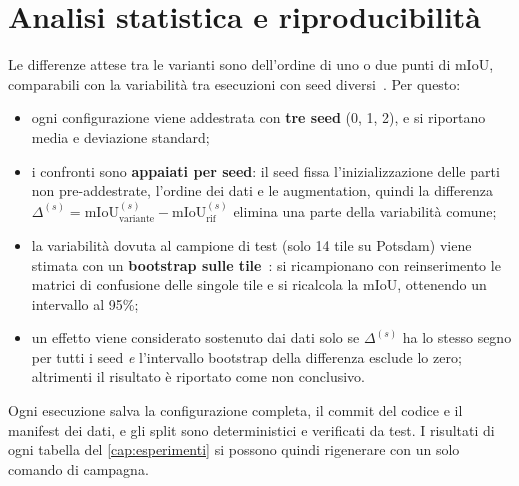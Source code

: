 \section{Analisi statistica e riproducibilità}
\label{sec:statistica}

Le differenze attese tra le varianti sono dell'ordine di uno o due punti di mIoU, comparabili con
la variabilità tra esecuzioni con seed diversi~\cite{bouthillier2021variance}. Per questo:

\begin{itemize}
  \item ogni configurazione viene addestrata con \textbf{tre seed} (0, 1, 2), e si riportano media
  e deviazione standard;
  \item i confronti sono \textbf{appaiati per seed}: il seed fissa l'inizializzazione delle parti
  non pre-addestrate, l'ordine dei dati e le augmentation, quindi la differenza
  $\Delta^{(s)}=\mathrm{mIoU}^{(s)}_{\mathrm{variante}}-\mathrm{mIoU}^{(s)}_{\mathrm{rif}}$
  elimina una parte della variabilità comune;
  \item la variabilità dovuta al campione di test (solo 14 tile su Potsdam) viene stimata con un
  \textbf{bootstrap sulle tile}~\cite{efron1993bootstrap}: si ricampionano con reinserimento le
  matrici di confusione delle singole tile e si ricalcola la mIoU, ottenendo un intervallo al
  95\%;
  \item un effetto viene considerato sostenuto dai dati solo se $\Delta^{(s)}$ ha lo stesso segno
  per tutti i seed \emph{e} l'intervallo bootstrap della differenza esclude lo zero; altrimenti
  il risultato è riportato come non conclusivo.
\end{itemize}


Ogni esecuzione salva la configurazione completa, il commit del codice e il manifest dei dati, e
gli split sono deterministici e verificati da test. I risultati di ogni tabella del
\cref{cap:esperimenti} si possono quindi rigenerare con un solo comando di campagna.
